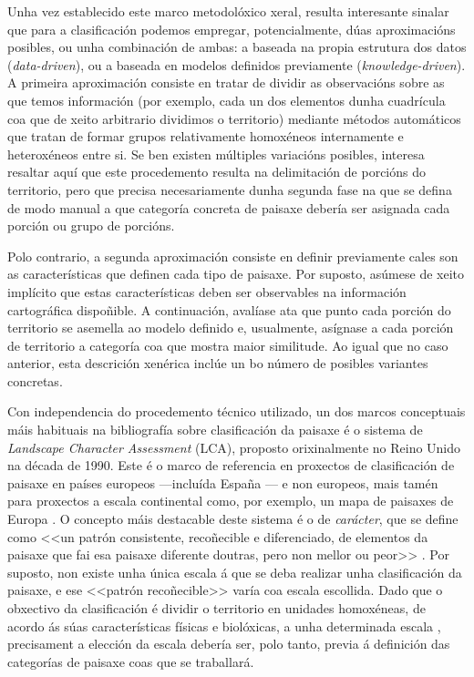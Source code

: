 \documentclass[11pt,a4paper]{article}
\begin{document}
Unha vez establecido este marco metodolóxico xeral, resulta interesante sinalar que para a clasificación podemos empregar, potencialmente, dúas aproximacións posibles, ou unha combinación de ambas: a baseada na propia estrutura dos datos (\emph{data-driven}), ou a baseada en modelos definidos previamente (\emph{knowledge-driven}). A primeira aproximación consiste en tratar de dividir as observacións sobre as que temos información (por exemplo, cada un dos elementos dunha cuadrícula coa que de xeito arbitrario dividimos o territorio) mediante métodos automáticos que tratan de formar grupos relativamente homoxéneos internamente e heteroxéneos entre si. Se ben existen múltiples variacións posibles, interesa resaltar aquí que este procedemento resulta na delimitación de porcións do territorio, pero que precisa necesariamente dunha segunda fase na que se defina de modo manual a que categoría concreta de paisaxe debería ser asignada cada porción ou grupo de porcións.

Polo contrario, a segunda aproximación consiste en definir previamente cales son as características que definen cada tipo de paisaxe. Por suposto, asúmese de xeito implícito que estas características deben ser observables na información cartográfica dispoñible. A continuación, avalíase ata que punto cada porción do territorio se asemella ao modelo definido e, usualmente, asígnase a cada porción de territorio a categoría coa que mostra maior similitude. Ao igual que no caso anterior, esta descrición xenérica inclúe un bo número de posibles variantes concretas.







Con independencia do procedemento técnico utilizado, un dos marcos conceptuais máis habituais na bibliografía sobre clasificación da paisaxe é o sistema de \emph{Landscape Character Assessment} (LCA), proposto orixinalmente no Reino Unido na década de 1990. Este é o marco de referencia en proxectos de clasificación de paisaxe en países europeos ---incluída España \citep{Valles2013}--- e non europeos, mais tamén para proxectos a escala continental como, por exemplo, un mapa de paisaxes de Europa \citep{Wascher2005,Mucher201087}. O concepto máis destacable deste sistema é o de \emph{carácter}, que se define como <<un patrón consistente, recoñecible e diferenciado, de elementos da paisaxe que fai esa paisaxe diferente doutras, pero non mellor ou peor>> \citep{TheCountrysideAgency2002}. Por suposto, non existe unha única escala á que se deba realizar unha clasificación da paisaxe, e ese <<patrón recoñecible>> varía coa escala escollida. Dado que o obxectivo da clasificación é dividir o territorio en unidades homoxéneas, de acordo ás súas características físicas e biolóxicas, a unha determinada escala \citep{Capotorti2012174}, precisament a elección da escala debería ser, polo tanto, previa á definición das categorías de paisaxe coas que se traballará.
\end{document}
